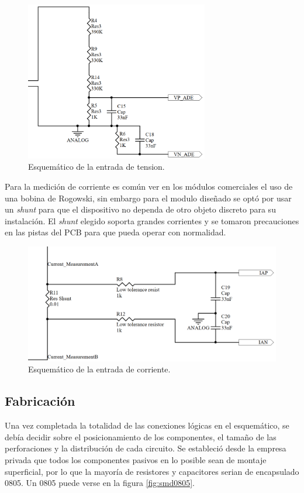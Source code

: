 \begin{figure}[htb]
	\centering
	\includegraphics[width=80mm,keepaspectratio]{Figures/medicionvoltaje.png}
	\caption{Esquemático de la entrada de tension.}
	\label{fig:medvolt}
\end{figure}

Para la medición de corriente es común ver en los módulos comerciales el uso de una bobina de Rogowski, sin embargo para el modulo diseñado se optó por usar un \textit{shunt} para que el dispositivo no dependa de otro objeto discreto para su instalación. El \textit{shunt} elegido soporta grandes corrientes y se tomaron precauciones en las pistas del PCB para que pueda operar con normalidad.

\begin{figure}[htb]
	\centering
	\includegraphics[width=120mm,keepaspectratio]{Figures/medicioncorriente.png}
	\caption{Esquemático de la entrada de corriente.}
	\label{fig:medcurrent}
\end{figure}

\subsection{Fabricación}

Una vez completada la totalidad de las conexiones lógicas en el esquemático, se debía decidir sobre el posicionamiento de los componentes, el tamaño de las perforaciones y la distribución de cada circuito. Se estableció desde la empresa privada que todos los componentes pasivos en lo posible sean de montaje superficial, por lo que la mayoría de resistores y capacitores serian de encapsulado 0805. Un 0805 puede verse en la figura \ref{fig:smd0805}.

